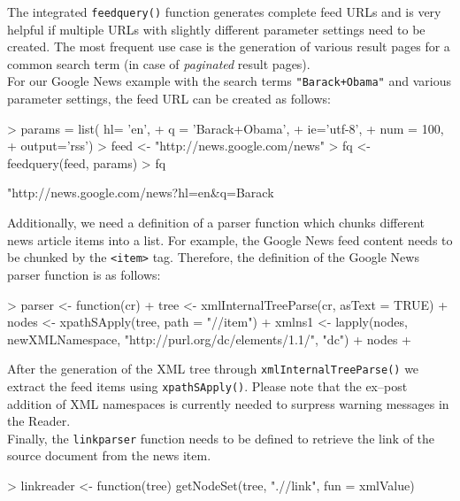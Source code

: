 \documentclass[a4paper]{article}
\newcommand{\class}[1]{\mbox{\textsf{#1}}}
\newcommand{\code}[1]{\mbox{\texttt{#1}}}
\newcommand{\proglang}[1]{\textsf{#1}}
\newcommand{\fkt}[1]{\code{#1()}}
\begin{document}
The integrated \fkt{feedquery} function generates complete feed  URLs and is very helpful if multiple
URLs with slightly different parameter settings need to be created. The most frequent use 
case is the generation of various result pages for a common search term (in case of \textit{paginated} result pages).\\
For our Google News example with the search terms \code{"Barack+Obama"} and various parameter settings,
the feed URL can be created as follows:
\begin{Schunk}
\begin{Sinput}
> params = list(	hl= 'en', 
+ 				q = 'Barack+Obama', 
+ 				ie='utf-8', 
+ 				num = 100, 
+ 				output='rss')
> feed <- "http://news.google.com/news"
> fq <- feedquery(feed, params)
> fq
\end{Sinput}
\begin{Soutput}
[1] "http://news.google.com/news?hl=en&q=Barack%
\end{Soutput}
\end{Schunk}
Additionally, we need a definition of a parser function which chunks different news article items into
a \class{list}. For example, the Google News feed content needs to be chunked by the \code{<item>} tag.
Therefore, the definition of the Google News parser function is as follows:
\begin{Schunk}
\begin{Sinput}
> parser <- function(cr){
+ 		tree <- xmlInternalTreeParse(cr, asText = TRUE)
+ 		nodes <- xpathSApply(tree, path = "//item")
+ 		xmlns1 <- lapply(nodes, newXMLNamespace, "http://purl.org/dc/elements/1.1/", "dc")
+ 		nodes
+ 	}
\end{Sinput}
\end{Schunk}
After the generation of the \proglang{XML} tree through \fkt{xmlInternalTreeParse} we extract the feed
items using \fkt{xpathSApply}. Please note that the ex--post addition of \proglang{XML} 
namespaces is currently needed to surpress warning messages in the \class{Reader}.\\
Finally, the \code{linkparser} function needs to be defined to retrieve the link of the source document from the 
news item.

\begin{Schunk}
\begin{Sinput}
> linkreader <- function(tree) getNodeSet(tree, ".//link", fun = xmlValue)
\end{Sinput}
\end{Schunk}
\end{document}
